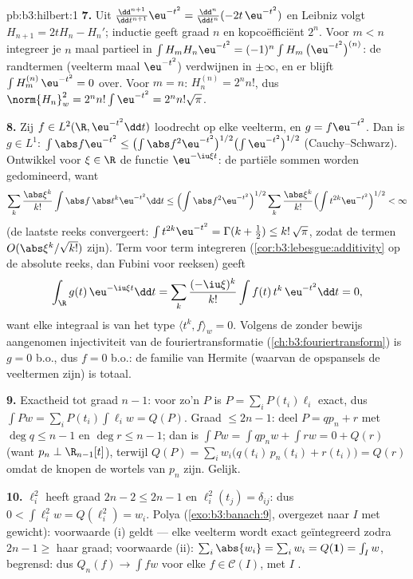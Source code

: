 \begin{solution}{pb:b3:hilbert:1}
\textbf{7.} Uit $\frac{\dd^{n+1}}{\dd t^{n+1}}\eu^{-t^2} =
\frac{\dd^n}{\dd t^n}(-2t\,\eu^{-t^2})$ en Leibniz volgt $H_{n+1}
= 2tH_n - H_n'$; inductie geeft graad $n$ en kopcoëfficiënt
$2^n$. Voor $m < n$ integreer je $n$ maal partieel in $\int H_m
H_n\eu^{-t^2} = (-1)^n\int H_m\,\bigl(\eu^{-t^2} \bigr)^{(n)}$:
de randtermen (veelterm maal $\eu^{-t^2}$) verdwijnen in
$\pm\infty$, en er blijft $\int H_m^{(n)}\,\eu^{-t^2} = 0$ over.
Voor $m = n$: $H_n^{(n)} = 2^nn!$, dus $\norm{H_n}_w^2 =
2^nn!\int\eu^{-t^2} = 2^nn!\sqrt\pi$.

\textbf{8.} Zij $f \in L^2(\R, \eu^{-t^2}\dd t)$ loodrecht op
elke veelterm, en $g = f\eu^{-t^2}$. Dan is $g \in L^1$:
$\int\abs f\eu^{-t^2} \leq \bigl(\int\abs
f^2\eu^{-t^2}\bigr)^{1/2}\bigl(\int\eu^{-t^2}\bigr)^{1/2}$
(Cauchy--Schwarz). Ontwikkel voor $\xi \in \R$ de functie
$\eu^{-\iu\xi t}$: de partiële sommen worden gedomineerd, want
\[
\sum_k\frac{\abs\xi^k}{k!}\int\abs f\,\abs t^k\eu^{-t^2}\dd t
\leq \Bigl(\int \abs f^2\eu^{-t^2}\Bigr)^{1/2}
\sum_k\frac{\abs\xi^k}{k!}\Bigl(\int
t^{2k}\eu^{-t^2}\Bigr)^{1/2} < \infty
\]
(de laatste reeks convergeert: $\int t^{2k}\eu^{-t^2} =
\Gamma(k+\frac12) \leq k!\,\sqrt\pi$, zodat de termen
$O(\abs\xi^k/\sqrt{k!})$ zijn). Term voor term integreren
(\cref{cor:b3:lebesgue:additivity} op de absolute reeks, dan
Fubini voor reeksen) geeft
\[
\int_\R g(t)\,\eu^{-\iu\xi t}\dd t
= \sum_k\frac{(-\iu\xi)^k}{k!}\int f(t)\,t^k\,\eu^{-t^2}\dd t
= 0 ,
\]
want elke integraal is van het type $\langle t^k, f\rangle_w =
0$. Volgens de zonder bewijs aangenomen injectiviteit van de
fouriertransformatie (\cref{ch:b3:fouriertransform}) is $g = 0$
b.o., dus $f = 0$ b.o.: de familie van Hermite (waarvan de
opspansels de veeltermen zijn) is totaal.

\textbf{9.} Exactheid tot graad $n - 1$: voor zo'n $P$ is $P =
\sum_iP(t_i)\ell_i$ exact, dus $\int Pw = \sum_iP(t_i)\int
\ell_iw = Q(P)$. Graad $\leq 2n - 1$: deel $P = qp_n + r$ met
$\deg q \leq n - 1$ en $\deg r \leq n-1$; dan is $\int Pw = \int
qp_nw + \int rw = 0 + Q(r)$ (want $p_n \perp \R_{n-1}[t]$),
terwijl $Q(P) = \sum_iw_i\bigl(q(t_i)\,p_n(t_i) + r(t_i)\bigr) =
Q(r)$ omdat de knopen de wortels van $p_n$ zijn. Gelijk.

\textbf{10.} $\ell_i^2$ heeft graad $2n - 2 \leq 2n - 1$ en
$\ell_i^2(t_j) = \delta_{ij}$: dus $0 < \int\ell_i^2w =
Q(\ell_i^2) = w_i$. Polya (\cref{exo:b3:banach:9}, overgezet naar
$I$ met gewicht): voorwaarde (i) geldt --- elke veelterm wordt
exact geïntegreerd zodra $2n - 1 \geq$ haar graad; voorwaarde
(ii): $\sum_i\abs{w_{i}} = \sum_iw_i = Q(\mathbf 1) = \int_Iw$,
begrensd: dus $Q_n(f) \to \int fw$ voor elke $f \in \mathcal
C(I)$, met $I$ .


\end{solution}
